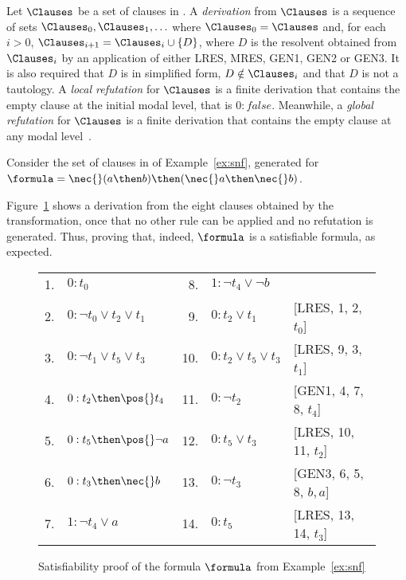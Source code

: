 \begin{definition}%
    \label{def:proof}
    Let $\Clauses$ be a set of clauses in . A \emph{derivation} from
    $\Clauses$ is a sequence of sets $\Clauses_0, \Clauses_1, \ldots$ where
    $\Clauses_0 = \Clauses$ and, for each $i > 0$, $\Clauses_{i+1} = \Clauses_i
    \cup \{D\}$, where $D$ is the resolvent obtained from $\Clauses_i$ by an
    application of either LRES, MRES, GEN1, GEN2 or GEN3. It is also required
    that $D$ is in simplified form, $D \notin \Clauses_i$ and that $D$ is not a
    tautology. A \emph{local refutation} for $\Clauses$ is a finite derivation
    that contains the empty clause at the initial modal level, that is $0:
    false$. Meanwhile, a \emph{global refutation} for
    $\Clauses$ is a finite derivation that contains the empty clause at any
    modal level~\cite{nalon2015modal}.
\end{definition}



\begin{example}%
    \label{ex:calcsat}
    Consider the set of clauses in  of Example~\ref{ex:snf}, generated
    for $\formula = \nec{}(a \then b) \then (\nec{} a \then \nec{}b)$.

    Figure~\ref{tab:calcsat} shows a derivation from the eight
    clauses obtained by the transformation, once that no other rule can be
    applied and no refutation is generated. Thus, proving that, indeed,
    $\formula$ is a satisfiable formula, as expected.

    \begin{figure}[h!]%
        \centering%
        \begin{tabular}{rlrll}
            1. & $0 : t_0$                        & 8. & $1 : \neg t_4 \lor \neg b$   & \\
            2. & $0 : \neg t_0 \lor t_2 \lor t_1$ & 9.  & $0 : t_2 \lor t_1$          & [LRES, 1, 2, $t_0$]\\ 
            3. & $0 : \neg t_1 \lor t_5 \lor t_3$ & 10. & $0 : t_2 \lor t_5 \lor t_3$ & [LRES, 9, 3, $t_1$]\\ 
            4. & $0 : t_2 \then \pos {}t_4$       & 11. & $0 : \neg t_2$              & [GEN1, 4, 7, 8, $t_4$]\\
            5. & $0 : t_5 \then \pos{} \neg a$    & 12. & $0 : t_5 \lor t_3$          & [LRES, 10, 11, $t_2$]\\ 
            6. & $0 : t_3 \then \nec{} b$         & 13. & $0 : \neg t_3$              & [GEN3, 6, 5, 8, $b, a$]\\
            7. & $1 : \neg t_4 \lor a$            & 14. & $0 : t_5$                   & [LRES, 13, 14, $t_3$] \\
       \end{tabular}%
        \caption{Satisfiability proof of the formula $\formula$ from Example~\ref{ex:snf}}%
        \label{tab:calcsat}
    \end{figure}
\end{example}

